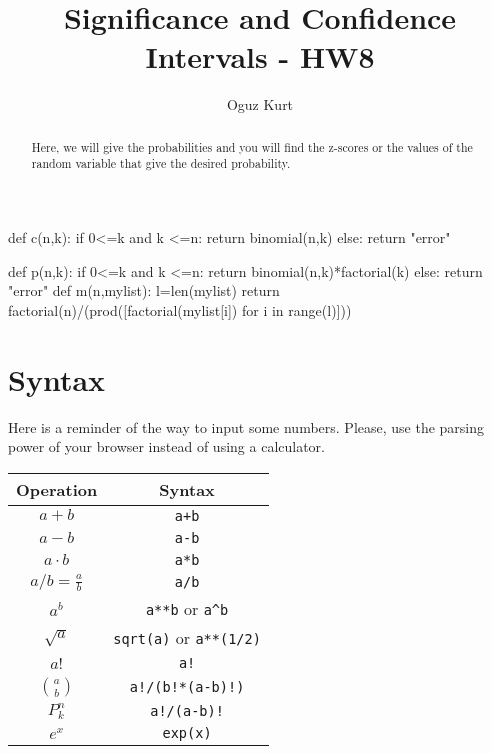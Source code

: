 \documentclass{ximera}
\title{Significance and Confidence Intervals - HW8}
\author{Oguz Kurt}
\begin{document}
\begin{abstract}
Here, we will give the probabilities and you will find the z-scores or the values of the random variable that give the desired probability.
\end{abstract}
\maketitle
\begin{sagesilent}
def c(n,k):
    if 0<=k and k <=n:
        return binomial(n,k)
    else:
        return "error"

def p(n,k):
    if 0<=k and k <=n:
        return binomial(n,k)*factorial(k)
    else:
        return "error"
def m(n,mylist):
    l=len(mylist)
    return factorial(n)/(prod([factorial(mylist[i]) for i in range(l)]))
\end{sagesilent}



\section*{Syntax}
Here is a reminder of the way to input some numbers. Please, use the parsing power of your browser instead of using a calculator.

\hspace{0.5cm}


\begin{tabular}{c|c}
Operation & Syntax  
\\
\hline
$a+b$ & {\color{red} \verb!a+b!} 
\\
\hline
$a- b$ & {\color{red} \verb!a-b!} 
\\
\hline
$a\cdot b$ & {\color{red} \verb!a*b! } 
\\
\hline
$a/b=\frac{a}{b}$ & {\color{red} \verb!a/b!}
\\
\hline
$a^b$ & {\color{red} \verb|a**b| or \verb|a^b|} 
\\
\hline
$\sqrt{a}$ & {\color{red} \verb|sqrt(a)| or \verb|a**(1/2)|} 
\\
\hline
$a!$ & {\color{red} \verb|a!|} 
\\
\hline
$\binom{a}{b}$ & {\color{red} \verb|a!/(b!*(a-b)!)|}
\\
\hline
$P_k^n$ & {\color{red} \verb|a!/(a-b)!|}
\\
\hline
$e^x$ & {\color{red} \verb|exp(x)|}
\\
\end{tabular}
\end{document}
